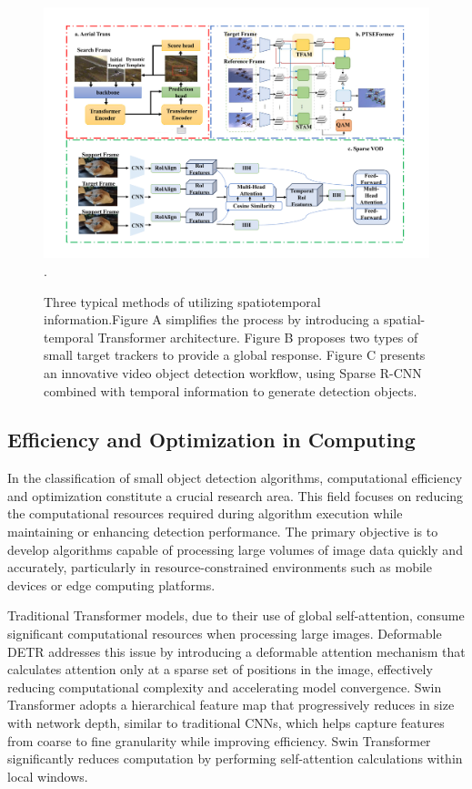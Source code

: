 \documentclass[journal]{IEEEtran}
\begin{document}
\begin{figure}[htbp]
	\centering
	\setlength{\abovecaptionskip}{-0.6cm}
	\includegraphics[width=\textwidth]{fig 8}
	\DeclareGraphicsExtensions.
	\caption{Three typical methods of utilizing spatiotemporal information.Figure A simplifies the process by introducing a spatial-temporal Transformer architecture. Figure B proposes two types of small target trackers to provide a global response. Figure C presents an innovative video object detection workflow, using Sparse R-CNN combined with temporal information to generate detection objects. }
	\label{fig 1}
\end{figure}

\subsection{Efficiency and Optimization in Computing}

In the classification of small object detection algorithms, computational efficiency and optimization constitute a crucial research area. This field focuses on reducing the computational resources required during algorithm execution while maintaining or enhancing detection performance. The primary objective is to develop algorithms capable of processing large volumes of image data quickly and accurately, particularly in resource-constrained environments such as mobile devices or edge computing platforms.

Traditional Transformer models, due to their use of global self-attention, consume significant computational resources when processing large images. Deformable DETR addresses this issue by introducing a deformable attention mechanism that calculates attention only at a sparse set of positions in the image, effectively reducing computational complexity and accelerating model convergence. Swin Transformer adopts a hierarchical feature map that progressively reduces in size with network depth, similar to traditional CNNs, which helps capture features from coarse to fine granularity while improving efficiency. Swin Transformer significantly reduces computation by performing self-attention calculations within local windows.
\end{document}
